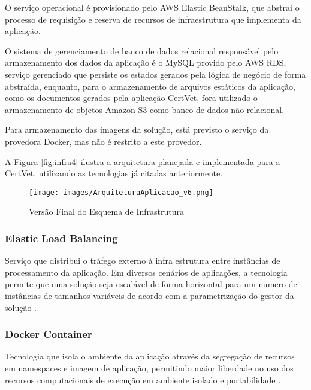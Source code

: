 \documentclass[
    12pt,               %
    openright,          %
    oneside,
    a4paper,            %
    BIBLATEX,           %
    TODO,               %
    english,            %
    brazil              %
    ]{ifsp-spo-inf-ctds}
\begin{document}
        O serviço operacional é provisionado pelo AWS Elastic BeanStalk, que abstrai o processo de requisição e reserva de recursos de infraestrutura que implementa da aplicação.
        
        O sistema de gerenciamento de banco de dados relacional responsável pelo armazenamento dos dados da aplicação é o MySQL provido pelo AWS RDS, serviço gerenciado que persiste os estados gerados pela lógica de negócio de forma abstraída, enquanto, para o armazenamento de arquivos estáticos da aplicação, como os documentos gerados pela aplicação CertVet, fora utilizado o armazenamento de objetos Amazon S3 como banco de dados não relacional.
        
        Para armazenamento das imagens da solução, está previsto o serviço da provedora Docker, mas não é restrito a este provedor.
        
        A Figura \ref{fig:infra4} ilustra a arquitetura planejada e implementada para a CertVet, utilizando as tecnologias já citadas anteriormente.
        

        \begin{figure}[H]
                \centering
                \caption{Versão Final do Esquema de Infrastrutura}
                \centering
                \texttt{[image: images/ArquiteturaAplicacao\_v6.png]}
                \label{fig:infra3}
        \end{figure}

        \subsubsection{Elastic Load Balancing}
        
            Serviço que distribui o tráfego externo à infra estrutura entre instâncias de processamento da aplicação. Em diversos cenários de aplicações, a tecnologia permite que uma solução seja escalável de forma horizontal para um numero de instâncias de tamanhos variáveis de acordo com a parametrização do gestor da solução .

        \subsubsection{Docker Container}

            Tecnologia que isola o ambiente da aplicação através da segregação de recursos em namespaces e imagem de aplicação, permitindo maior liberdade no uso dos recursos computacionais de execução em ambiente isolado e portabilidade .
            
\end{document}
